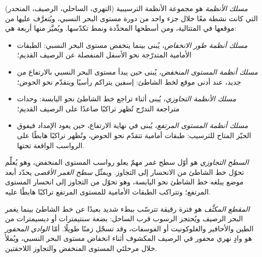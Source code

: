 \begin{definition}\label{def:b3:sequence-stratigraphy:tract}
\emph{مسلك الأنظمة} هو مجموعة الأنظمة الترسيبية
(النهري، الساحلي، الرصيف، المنحدر) التي كانت نشطة معًا خلال جزء واحد
من دورة مستوى البحر النسبي، ويُتعرَّف عليها من موقعها في
المتتالية، ومن أسطحها المحدِّدة ونمط تكدّسها. ويُميَّز منها أربعة
هي:
\begin{itemize}
\item \emph{مسلك أنظمة طور الانخفاض}،
  يُبنى  بينما ينخفض مستوى البحر النسبي:
  الطبقات الأمامية المتدرّجة نحو الأسفل المنفصلة عن الرصيف القديم؛
\item \emph{مسلك أنظمة المستوى المنخفض}،
  يُبنى  حين يبدأ مستوى البحر النسبي بالارتفاع من جديد،
  عند أدنى موقع لخط الشاطئ: إسفين يتراكم رأسيًا ويتقدّم نحو الحوض؛
\item \emph{مسلك الأنظمة التجاوزي}،
  يُبنى أثناء تراجع خط الشاطئ نحو اليابسة: وحدات متراجعة التدرّج
  تُظهر تراكبًا صاعدًا على الرصيف القديم؛
\item \emph{مسلك أنظمة المستوى المرتفع}،
  يُبنى  في نهاية الارتفاع، حين يعود الإمداد فيفوق
  الحيّز المتاح للترسيب: طبقات أمامية تتقدّم نحو الحوض، وتُظهر تراكبًا هابطًا على الرواسب الواقعة تحتها.
\end{itemize}
\end{definition}

\begin{definition}\label{def:b3:sequence-stratigraphy:surfaces}
\emph{السطح التجاوزي} هو أوّل سطح غمر مهمّ يعلو
رواسب المستوى المنخفض، وهو يُعلِّم
تحوّل خط الشاطئ من الانحسار إلى التجاوز. ويمثّل \emph{سطح الغمر
الأقصى} يحدّد أبعد موضع يبلغه خط
الشاطئ نحو اليابسة، وهو تحوّل من التجاوز إلى انحسار المستوى المرتفع؛ وتتراكب
الطبقات الأمامية للمستوى المرتفع تراكبًا هابطًا عليه.
\end{definition}

\begin{definition}\label{def:b3:sequence-stratigraphy:condensed}
\emph{المقطع المكثَّف} هو فترة رقيقة
تترسّب ببطء شديد بعيدًا عن خط الشاطئ بينما يغمر البحر الرصيف
ويُحتجز الرسوب قرب الساحل: بضعة سنتيمترات أو ديسيمترات
من الطين والأحافير والغلوكونيت أو الفوسفات، وقد تسجّل زمنًا طويلًا. أمّا
\emph{الوادي المحفور} هو وادٍ نهري محفور في
الرصيف المكشوف أثناء انخفاض مستوى البحر النسبي، ويُملأ خلال
مرحلتَي المستوى المنخفض والتجاوز اللاحقتين.
\end{definition}

